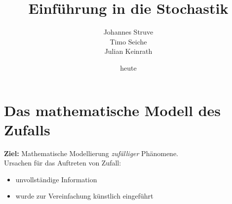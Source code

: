 \documentclass[linedtoc,longdoc,colorback,accentcolor=tud1a,bigchapter,leqno,12pt,article]{tudreport}
\title{Einführung in die Stochastik}
\author{Johannes Struve\\Timo Seiche\\Julian Keinrath}
\date{heute}
\theoremstyle{plain}
\theoremstyle{plain}
\theoremstyle{remark}
\begin{document}

\maketitle



\tableofcontents
\newpage

\chapter{Das mathematische Modell des Zufalls}
\textbf{Ziel:} Mathematische Modellierung \emph{zufälliger} Phänomene.\\
Ursachen für das Auftreten von Zufall:
\begin{itemize}
\item unvollständige Information
\item wurde zur Vereinfachung künstlich eingeführt
\end{itemize}
\end{document}

